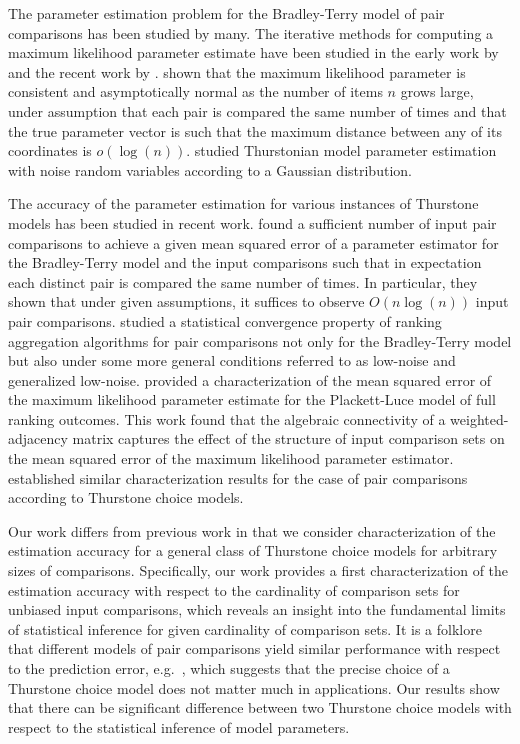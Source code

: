 The parameter estimation problem for the Bradley-Terry model of pair comparisons has been studied by many. The iterative methods for computing a maximum likelihood parameter estimate have been studied in the early work by \cite{hunter2004mm} and the recent work by \cite{maystre2015fast}. \cite{SY99} shown that the maximum likelihood parameter is consistent and asymptotically normal as the number of items $n$ grows large, under assumption that each pair is compared the same number of times and that the true parameter vector is such that the maximum distance between any of its coordinates is $o(\log(n))$. \cite{M99} studied Thurstonian model parameter estimation with noise random variables according to a Gaussian distribution.

The accuracy of the parameter estimation for various instances of Thurstone models has been studied in recent work. \cite{negahban2012rank} found a sufficient number of input pair comparisons to achieve a given mean squared error of a parameter estimator for the Bradley-Terry model and the input comparisons such that in expectation each distinct pair is compared the same number of times. In particular, they shown that under given assumptions, it suffices to observe $O(n \log(n))$ input pair comparisons. \cite{RA14} studied a statistical convergence property of ranking aggregation algorithms for pair comparisons not only for the Bradley-Terry model but also under some more general conditions referred to as low-noise and generalized low-noise. \cite{hajek2014minimax} provided a characterization of the mean squared error of the maximum likelihood parameter estimate for the Plackett-Luce model of full ranking outcomes. This work found that the algebraic connectivity of a weighted-adjacency matrix captures the effect of the structure of input comparison sets on the mean squared error of the maximum likelihood parameter estimator. \cite{SBBPRW16} established similar characterization results for the case of pair comparisons according to Thurstone choice models.   

Our work differs from previous work in that we consider characterization of the estimation accuracy for a general class of Thurstone choice models for arbitrary sizes of comparisons. Specifically, our work provides a first characterization of the estimation accuracy with respect to the cardinality of comparison sets for unbiased input comparisons, which reveals an insight into the fundamental limits of statistical inference for given cardinality of comparison sets. It is a folklore that different models of pair comparisons yield similar performance with respect to the prediction error, e.g.~\cite{S92}, which suggests that the precise choice of a Thurstone choice model does not matter much in applications. Our results show that there can be significant difference between two Thurstone choice models with respect to the statistical inference of model parameters. 

